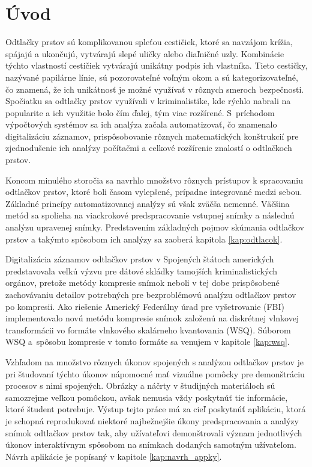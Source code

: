 \chapter{Úvod}
  Odtlačky prstov sú komplikovanou spleťou cestičiek, ktoré sa navzájom krížia, spájajú a ukončujú, vytvárajú slepé uličky alebo diaľničné uzly.
  Kombinácie týchto vlastností cestičiek vytvárajú unikátny podpis ich vlastníka. Tieto cestičky, nazývané papilárne línie, sú pozorovateľné
  voľným okom a sú kategorizovateľné, čo znamená, že ich unikátnosť je možné využívať v rôznych smeroch bezpečnosti. Spočiatku sa odtlačky prstov
  využívali v kriminalistike, kde rýchlo nabrali na popularite a ich využitie bolo čím ďalej, tým viac rozšírené. S~príchodom výpočtových systémov
  sa ich analýza začala automatizovať, čo znamenalo digitalizáciu záznamov, prispôsobovanie rôznych matematických konštrukcií pre zjednodušenie ich
  analýzy počítačmi a celkové rozšírenie znalostí o odtlačkoch prstov. 
  
  Koncom minulého storočia sa navrhlo množstvo rôznych prístupov k spracovaniu odtlačkov prstov, ktoré boli časom vylepšené, prípadne integrované
  medzi sebou. Základné princípy automatizovanej analýzy sú však zväčša nemenné. Väčšina metód sa spolieha na viackrokové predspracovanie
  vstupnej snímky a následnú analýzu upravenej snímky. Predstavením základných pojmov skúmania odtlačkov prstov a takýmto spôsobom ich analýzy
  sa zaoberá kapitola \ref{kap:odtlacok}.

  Digitalizácia záznamov odtlačkov prstov v Spojených štátoch amerických predstavovala veľkú výzvu pre dátové skládky tamojších kriminalistických orgánov, pretože 
  metódy kompresie snímok neboli v tej dobe prispôsobené zachovávaniu detailov potrebných pre bezproblémovú analýzu odtlačkov prstov 
  po kompresii. Ako riešenie Americký Federálny úrad pre vyšetrovanie (FBI) implementovalo novú metódu kompresie snímok založenú na diskrétnej vlnkovej transformácii
  vo formáte vlnkového skalárneho kvantovania (WSQ). Súborom WSQ a~spôsobu kompresie v tomto formáte sa venujem v kapitole \ref{kap:wsq}.

  Vzhľadom na množstvo rôznych úkonov spojených s analýzou odtlačkov prstov je pri študovaní týchto úkonov nápomocné mať vizuálne pomôcky
  pre demonštráciu procesov s nimi spojených. Obrázky a náčrty v študijných materiáloch sú samozrejme veľkou pomôckou, avšak nemusia vždy
  poskytnúť tie informácie, ktoré študent potrebuje. Výstup tejto práce má za cieľ poskytnúť aplikáciu, ktorá je schopná reprodukovať
  niektoré najbežnejšie úkony predspracovania a analýzy snímok odtlačkov prstov tak, aby užívateľovi demonštrovali význam jednotlivých úkonov
  interaktívnym spôsobom na snímkach dodaných samotným užívateľom. Návrh aplikácie je popísaný v kapitole \ref{kap:navrh_appky}.
  
